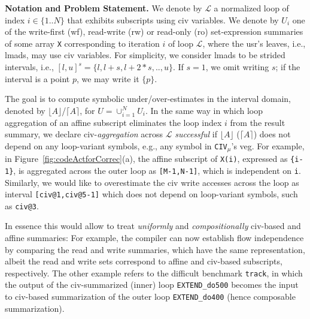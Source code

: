 \documentclass{sig-alternate}
\begin{document}
{\bf Notation and Problem Statement.}
%
We denote by $\mathcal{L}$ a normalized loop of index $i\in\{1..N\}$ that
exhibits subscripts using {\sc civ} variables.
%
We denote by $U_i$ one of the write-first ({\sc wf}), read-write ({\sc rw})
or read-only ({\sc ro}) set-expression summaries of some array {\tt X} 
corresponding to iteration $i$ of loop $\mathcal{L}$, where the {\sc usr}'s 
leaves, i.e., {\sc lmad}s, may use {\sc civ} variables. 
%
For simplicity, we consider {\sc lmad}s to be 
strided intervals, i.e., $[l,u]^s=\{l, l+s, l+2*s, .., u\}$.
If $s=1$, we omit writing $s$; if the interval 
is a point $p$, we may write it $\{p\}$.

The goal is to compute symbolic under/over-estimates in the 
interval domain, denoted by $\lfloor A \rfloor$/$\lceil A \rceil$, 
for $U = \cup_{i=1}^{N} U_i$.
%
In the same way in which loop aggregation of an affine subscript  
eliminates the loop index $i$ from the result summary,
we declare {\sc civ}-{\em aggregation} across $\mathcal{L}$ {\em successful} 
if $\lfloor A \rfloor$ ($\lceil A \rceil$) does not depend on any loop-variant
symbols, e.g., any symbol in {\tt CIV}$_{\mu}$'s  {\sc veg}. %
%
For example, in Figure~\ref{fig:codeActforCorrec}(a), the affine
subscript of {\tt X(i)}, expressed as {\tt\{i-1\}}, is aggregated across 
the outer loop as {\tt[M-1,N-1]}, which is independent on {\tt i}. 
Similarly, we would like to overestimate the {\sc civ} write accesses 
across the loop as interval {\tt[civ@1,civ@5-1]} which does
not depend on loop-variant symbols, such as {\tt civ@3}.

In essence this would allow to treat {\em uniformly} and {\em compositionally} 
{\sc civ}-based and affine summaries: For example, the compiler can now 
establish flow independence by comparing the read and write summaries, 
which have the same representation, albeit the read and write sets
correspond to affine and {\sc civ}-based subscripts, respectively.
The other example refers to the difficult benchmark
{\tt track}, in which the output of the {\sc civ}-summarized (inner) loop 
{\tt EXTEND\_do500} becomes the input to {\sc civ}-based summarization 
of the outer loop {\tt EXTEND\_do400} (hence composable summarization).

%
%
\end{document}
